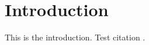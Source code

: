 \graphicspath{{main-matter/intro/resources/}}

\chapter{Introduction}\label{chap_intro}

This is the introduction. Test citation \cite{zampini_role_2004}.
